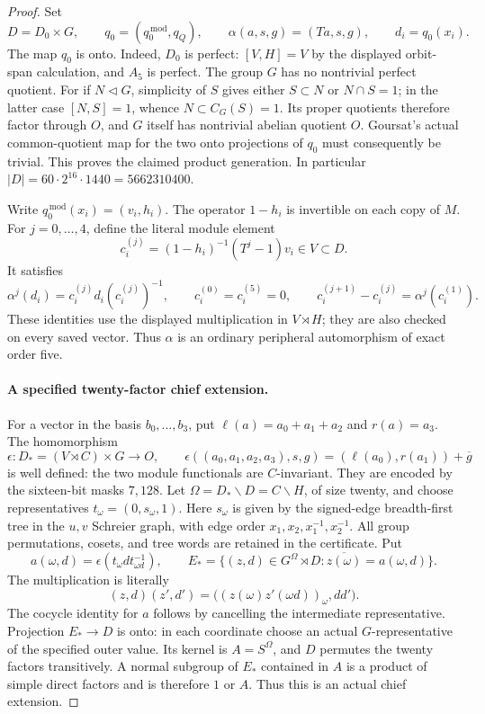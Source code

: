\begin{proof}
Set
\[
 D=D_0\times G,\qquad
 q_0=(q_0^{\,\mathrm{mod}},q_Q),\qquad
 \alpha(a,s,g)=(Ta,s,g),\qquad d_i=q_0(x_i).
 \tag{D.36.10}
\]
The map \(q_0\) is onto.  Indeed, \(D_0\) is perfect:
\([V,H]=V\) by the displayed orbit-span calculation, and \(A_5\)
is perfect.  The group \(G\) has no nontrivial perfect quotient.
For if \(N\lhd G\), simplicity of \(S\) gives either \(S\subset N\)
or \(N\cap S=1\); in the latter case \([N,S]=1\), whence
\(N\subset C_G(S)=1\).  Its proper quotients therefore factor
through \(O\), and \(G\) itself has nontrivial abelian quotient
\(O\).  Goursat's actual common-quotient map for the two onto
projections of \(q_0\) must consequently be trivial.
This proves the claimed product generation.
In particular \(|D|=60\cdot2^{16}\cdot1440=5662310400\).

Write \(q_0^{\,\mathrm{mod}}(x_i)=(v_i,h_i)\).
The operator \(1-h_i\) is invertible on each copy of \(M\).
For \(j=0,\ldots,4\), define the literal module element
\[
 c_i^{(j)}=(1-h_i)^{-1}(T^j-1)v_i\in V\subset D.
 \tag{D.36.11}
\]
It satisfies
\[
 \alpha^j(d_i)=c_i^{(j)}d_i(c_i^{(j)})^{-1},\qquad
 c_i^{(0)}=c_i^{(5)}=0,\qquad
 c_i^{(j+1)}-c_i^{(j)}=\alpha^j(c_i^{(1)}).
 \tag{D.36.12}
\]
These identities use the displayed multiplication in \(V\rtimes H\);
they are also checked on every saved vector.  Thus \(\alpha\)
is an ordinary peripheral automorphism of exact order five.

\paragraph{A specified twenty-factor chief extension.}
For a vector in the basis \(b_0,\ldots,b_3\), put
\(\ell(a)=a_0+a_1+a_2\) and \(r(a)=a_3\).
The homomorphism
\[
 \epsilon:D_*=(V\rtimes C)\times G\longrightarrow O,\qquad
 \epsilon((a_0,a_1,a_2,a_3),s,g)
       =(\ell(a_0),r(a_1))+\overline g
 \tag{D.36.13}
\]
is well defined: the two module functionals are \(C\)-invariant.
They are encoded by the sixteen-bit masks \(7,128\).
Let \(\Omega=D_*\backslash D=C\backslash H\), of size twenty,
and choose representatives \(t_\omega=(0,s_\omega,1)\).
Here \(s_\omega\) is given by the signed-edge breadth-first tree
in the \(u,v\) Schreier graph, with edge order
\(x_1,x_2,x_1^{-1},x_2^{-1}\).  All group permutations, cosets,
and tree words are retained in the certificate.
Put
\[
 a(\omega,d)=\epsilon(t_\omega d t_{\omega d}^{-1}),\qquad
 E_*=\{(z,d)\in G^\Omega\rtimes D:
                   \overline{z(\omega)}=a(\omega,d)\}.
 \tag{D.36.14}
\]
The multiplication is literally
\[
 (z,d)(z',d')
       =\bigl((z(\omega)z'(\omega d))_\omega,dd'\bigr).
 \tag{D.36.15}
\]
The cocycle identity for \(a\) follows by cancelling the intermediate
representative.  Projection \(E_*\to D\) is onto: in each coordinate
choose an actual \(G\)-representative of the specified outer value.
Its kernel is \(A=S^\Omega\), and \(D\) permutes the twenty factors
transitively.  A normal subgroup of \(E_*\) contained in \(A\)
is a product of simple direct factors and is therefore \(1\) or
\(A\).  Thus this is an actual chief extension.


\end{proof}
